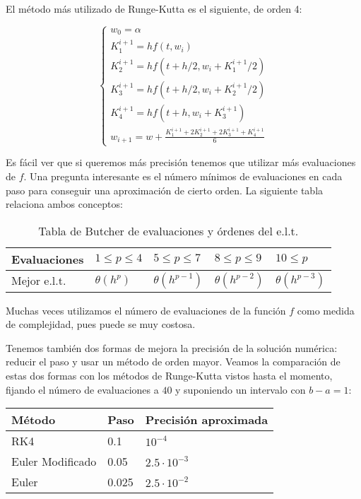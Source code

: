 El método más utilizado de Runge-Kutta es el siguiente, de orden 4:

\begin{definition}
\begin{equation}
\begin{cases}
    w_0=\alpha \\
    K_1^{i+1} = hf(t,w_i)\\
    K_2^{i+1} = hf(t + h/2,w_i+ K_1^{i+1}/2)\\
    K_3^{i+1} = hf(t + h/2,w_i+ K_2^{i+1}/2)\\
    K_4^{i+1} = hf(t + h,w_i + K_3^{i+1})\\

    w_{i+1}=w + \frac{K_1^{i+1} + 2K_2^{i+1} + 2K_3^{i+1} + K_4^{i+1}}{6}
\end{cases}
\end{equation}

\end{definition}


Es fácil ver que si queremos más precisión tenemos que utilizar más evaluaciones de $f$. Una pregunta interesante es el número mínimos de evaluaciones en cada paso para conseguir una aproximación de cierto orden. La siguiente tabla relaciona ambos conceptos:

\begin{table}[H]
\centering
\begin{tabular}{|l||l|l|l|l|}
    \hline
Evaluaciones & $1\le p \le 4$ & $5\le p\le 7$ & $8\le p\le 9$  & $10\le p$ \\
    \hline
Mejor e.l.t. & $\theta(h^p)$ & $\theta(h^{p-1})$ & $\theta(h^{p-2})$ & $\theta(h^{p-3})$ \\
    \hline
\end{tabular}
\caption{Tabla de Butcher de evaluaciones y órdenes del e.l.t.}
\end{table}

Muchas veces utilizamos el número de evaluaciones de la función $f$ como medida de complejidad, pues puede se muy costosa.

Tenemos también dos formas de mejora la precisión de la solución numérica: reducir el paso y usar un método de orden mayor. Veamos la comparación de estas dos formas con los métodos de Runge-Kutta vistos hasta el momento, fijando el número de evaluaciones a $40$ y suponiendo un intervalo con $b-a=1$:

\begin{table}[H]
\centering
\begin{tabular}{|l|l|l|}
    \hline
Método           & Paso  & Precisión aproximada \\
    \hline
    \hline
RK4              & 0.1   & $10^{-4}$ \\
    \hline
Euler Modificado & 0.05  & $2.5\cdot 10^{-3}$ \\
    \hline
Euler            & 0.025 & $2.5\cdot 10^{-2}$ \\
    \hline
\end{tabular}
\end{table}

